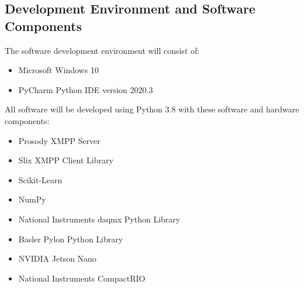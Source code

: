 \documentclass[letterpaper]{article}
\begin{document}
{{\subsection{Development Environment and Software Components}
The software development environment will consist of:
\begin{itemize}
	\item{Microsoft Windows 10}
	\item{PyCharm Python IDE version 2020.3}
\end{itemize}
All software will be developed using Python 3.8 with these software and hardware components:
\begin{itemize}
	\item{Prosody XMPP Server}
	\item{Slix XMPP Client Library}
	\item{Scikit-Learn}
	\item{NumPy}
	\item{National Instruments daqmx Python Library}
	\item{Basler Pylon Python Library}
	\item{NVIDIA Jetson Nano}
	\item{National Instruments CompactRIO}
\end{itemize}

}}
\end{document}

